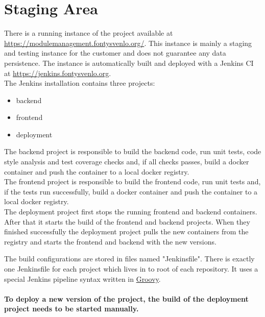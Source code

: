 \chapter{Staging Area}
\label{ch:staging}

There is a running instance of the project available at \url{https://modulemanagement.fontysvenlo.org/}.
This instance is mainly a staging and testing instance for the customer and does not guarantee any data persistence.
The instance is automatically built and deployed with a Jenkins CI at \url{https://jenkins.fontysvenlo.org}.
~\\
The Jenkins installation contains three projects:
\begin{itemize}
	\item backend
	\item frontend
	\item deployment
\end{itemize}


The backend project is responsible to build the backend code, run unit tests, code style analysis and test coverage checks and, if all checks passes, build a docker container and push the container to a local docker registry. \\

The frontend project is responsible to build the frontend code, run unit tests and, if the tests run successfully, build a docker container and push the container to a local docker registry. \\

The deployment project first stops the running frontend and backend containers. After that it starts the build of the frontend and backend projects. When they finished successfully the deployment project pulls the new containers from the registry and starts the frontend and backend with the new versions.

The build configurations are stored in files named "Jenkinsfile". There is exactly one Jenkinsfile for each project which lives in to root of each repository.
It uses a special Jenkins pipeline syntax written in \href{https://en.wikipedia.org/wiki/Groovy_(programming_language)}{Groovy}. \\
\\
\textbf{To deploy a new version of the project, the build of the deployment project needs to be started manually.}
